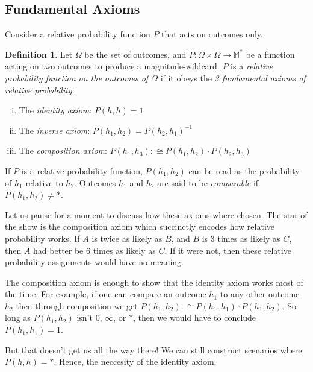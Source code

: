 \documentclass[twoside]{article}
\theoremstyle{plain}%
\theoremstyle{definition}
\newtheorem{definition}{Definition}[section]
\theoremstyle{remark}
\begin{document}
\subsection{Fundamental Axioms}

Consider a relative probability function \(P\) that acts on outcomes only.

\begin{definition}
\label{def:fundamental_laws}
Let \(\Omega\) be the set of outcomes, and \(P: \Omega \times \Omega \rightarrow \mathbb{M}^*\) be a function acting on two outcomes to produce a magnitude-wildcard. \(P\) is a \textit{relative probability function on the outcomes of \(\Omega\)} if it obeys the \textit{3 fundamental axioms of relative probability}:

\begin{enumerate}[(i)]
\item The \textit{identity axiom}: \(P(h, h) = 1\)
\item The \textit{inverse axiom}: \(P(h_1, h_2) = P(h_2, h_1)^{-1}\)
\item The \textit{composition axiom}: \(P(h_1, h_3) :\cong P(h_1, h_2) \cdot P(h_2, h_3)\)
\end{enumerate}

\end{definition}

If \(P\) is a relative probability function, \(P(h_1, h_2)\) can be read as the probability of \(h_1\) relative to \(h_2\). Outcomes \(h_1\) and \(h_2\) are said to be \textit{comparable} if \(P(h_1, h_2) \neq \ast\).

Let us pause for a moment to discuss how these axioms where chosen. The star of the show is the composition axiom which succinctly encodes how relative probability works. If \(A\) is twice as likely as \(B\), and \(B\) is 3 times as likely as \(C\), then \(A\) had better be 6 times as likely as \(C\). If it were not, then these relative probability assignments would have no meaning.

The composition axiom is enough to show that the identity axiom works most of the time. For example, if one can compare an outcome \(h_1\) to any other outcome \(h_2\) then through composition we get \(P(h_1, h_2) :\cong P(h_1, h_1) \cdot P(h_1, h_2)\). So long as \(P(h_1, h_2)\) isn't \(0\), \(\infty\), or \(\ast\), then we would have to conclude \(P(h_1, h_1) = 1\).

But that doesn't get us all the way there! We can still construct scenarios where \(P(h, h) = \ast\). Hence, the neccesity of the identity axiom.
\end{document}
